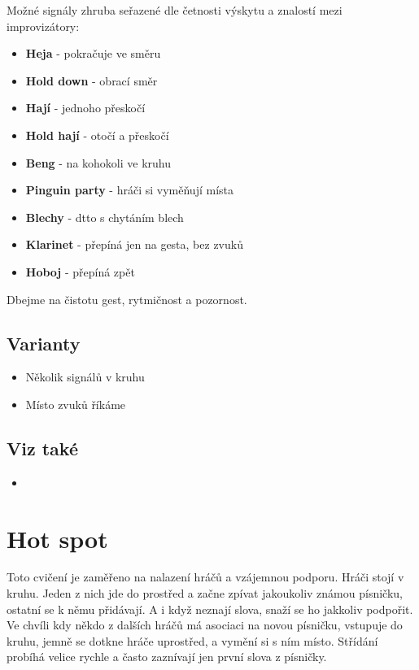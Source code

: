 Možné signály zhruba seřazené dle četnosti výskytu a znalostí mezi improvizátory: 
\begin{itemize}
\item \textbf{Heja}{} - pokračuje ve směru
\item \textbf{Hold down}{} - obrací směr
\item \textbf{Hají}{} - jednoho přeskočí
\item \textbf{Hold hají}{} - otočí a přeskočí
\item \textbf{Beng}{} - na kohokoli ve kruhu
\item \textbf{Pinguin party}{} - hráči si vyměňují místa
\item \textbf{Blechy}{} -  dtto s chytáním blech
\item \textbf{Klarinet}{} -  přepíná jen na gesta, bez zvuků
\item \textbf{Hoboj}{} - přepíná zpět
\end{itemize}
 
Dbejme na čistotu gest, rytmičnost a pozornost. 
 
\subsection{Varianty} \begin{itemize}
\item Několik signálů v kruhu
\item Místo zvuků říkáme 
\end{itemize}
 
\subsection{Viz také} \begin{itemize}
\item  {}
\end{itemize}
 
 
 
\needspace{5cm} \section{Hot spot} \label{hot spot} Toto cvičení je zaměřeno na nalazení hráčů a vzájemnou podporu. Hráči stojí v kruhu. Jeden z nich jde do prostřed a začne zpívat jakoukoliv známou písničku, ostatní se k němu přidávají. A i když neznají slova, snaží se ho jakkoliv podpořit. Ve chvíli kdy někdo z dalších hráčů má asociaci na novou písničku, vstupuje do kruhu, jemně se dotkne hráče uprostřed, a vymění si s ním místo. Střídání probíhá velice rychle a často zaznívají jen první slova z písničky. 
 
